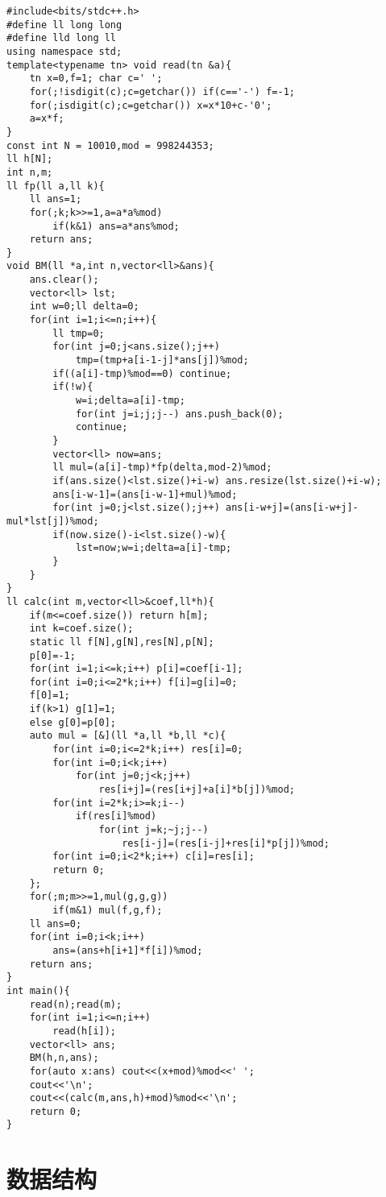 \documentclass[UTF8]{ctexart}
\begin{document}
\begin{framed}
\begin{lstlisting}
#include<bits/stdc++.h>
#define ll long long
#define lld long ll
using namespace std;
template<typename tn> void read(tn &a){
    tn x=0,f=1; char c=' ';
    for(;!isdigit(c);c=getchar()) if(c=='-') f=-1;
    for(;isdigit(c);c=getchar()) x=x*10+c-'0';
    a=x*f;
}
const int N = 10010,mod = 998244353;
ll h[N];
int n,m;
ll fp(ll a,ll k){
    ll ans=1;
    for(;k;k>>=1,a=a*a%mod)
        if(k&1) ans=a*ans%mod;
    return ans;
}
void BM(ll *a,int n,vector<ll>&ans){
    ans.clear();
    vector<ll> lst;
    int w=0;ll delta=0;
    for(int i=1;i<=n;i++){
        ll tmp=0;
        for(int j=0;j<ans.size();j++)
            tmp=(tmp+a[i-1-j]*ans[j])%mod;
        if((a[i]-tmp)%mod==0) continue;
        if(!w){
            w=i;delta=a[i]-tmp;
            for(int j=i;j;j--) ans.push_back(0);
            continue;
        }
        vector<ll> now=ans;
        ll mul=(a[i]-tmp)*fp(delta,mod-2)%mod;
        if(ans.size()<lst.size()+i-w) ans.resize(lst.size()+i-w);
        ans[i-w-1]=(ans[i-w-1]+mul)%mod;
        for(int j=0;j<lst.size();j++) ans[i-w+j]=(ans[i-w+j]-mul*lst[j])%mod;
        if(now.size()-i<lst.size()-w){
            lst=now;w=i;delta=a[i]-tmp;
        }
    }
}
ll calc(int m,vector<ll>&coef,ll*h){
    if(m<=coef.size()) return h[m];
    int k=coef.size();
    static ll f[N],g[N],res[N],p[N];
    p[0]=-1;
    for(int i=1;i<=k;i++) p[i]=coef[i-1];
    for(int i=0;i<=2*k;i++) f[i]=g[i]=0;
    f[0]=1;
    if(k>1) g[1]=1;
    else g[0]=p[0];
    auto mul = [&](ll *a,ll *b,ll *c){
        for(int i=0;i<=2*k;i++) res[i]=0;
        for(int i=0;i<k;i++)
            for(int j=0;j<k;j++)
                res[i+j]=(res[i+j]+a[i]*b[j])%mod;
        for(int i=2*k;i>=k;i--)
            if(res[i]%mod)
                for(int j=k;~j;j--)
                    res[i-j]=(res[i-j]+res[i]*p[j])%mod;
        for(int i=0;i<2*k;i++) c[i]=res[i];
        return 0;
    };
    for(;m;m>>=1,mul(g,g,g))
        if(m&1) mul(f,g,f);
    ll ans=0;
    for(int i=0;i<k;i++)
        ans=(ans+h[i+1]*f[i])%mod;
    return ans;
}
int main(){
    read(n);read(m);
    for(int i=1;i<=n;i++)
        read(h[i]);
    vector<ll> ans;
    BM(h,n,ans);
    for(auto x:ans) cout<<(x+mod)%mod<<' ';
    cout<<'\n';
    cout<<(calc(m,ans,h)+mod)%mod<<'\n';
    return 0;
}
\end{lstlisting}
\end{framed}


\newpage
\section{数据结构}
\end{document}
